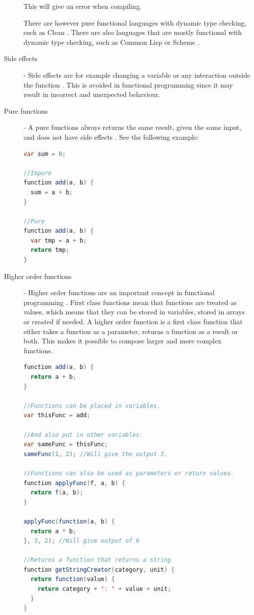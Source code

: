 \documentclass {article}
\begin{document}
\begin{description}
\item [ ] This will give an error when compiling.
\item[] There are however pure functional languages with dynamic type checking, such as Clean \cite{clean}. There are also languages that are mostly functional with dynamic type checking, such as Common Lisp \cite{commonLisp} or Scheme \cite{scheme} \cite{langTable}.
\item [Side effects] - Side effects are for example changing a variable or any interaction outside the function \cite{drboolean}. This is avoided in functional programming since it may result in incorrect and unexpected behaviour. 
\item [Pure functions] - A pure functions always returns the same result, given the same input, and does not have side effects \cite{drboolean}. See the following example: 

\begin{lstlisting}[language=Java]
var sum = 0;

//Impure
function add(a, b) {
  sum = a + b;
}

//Pure
function add(a, b) {
  var tmp = a + b;
  return tmp;
}
\end{lstlisting}

\item [Higher order functions] - Higher order functions are an important concept in functional programming \cite{fogus}. First class functions mean that functions are treated as values, which means that they can be stored in variables, stored in arrays or created if needed. A higher order function is a first class function that either takes a function as a parameter, returns a function as a result or both. This makes it possible to compose larger and more complex functions.

\begin{lstlisting}[language=Java, breaklines=true]
function add(a, b) {
  return a + b;
}

//Functions can be placed in variables.
var thisFunc = add;

//And also put in other variables.
var sameFunc = thisFunc;
sameFunc(1, 2); //Will give the output 3.

//Functions can also be used as parameters or return values.
function applyFunc(f, a, b) {
  return f(a, b);
}

applyFunc(function(a, b) {
  return a * b;
}, 3, 2); //Will give output of 6

//Returns a function that returns a string
function getStringCreator(category, unit) {
  return function(value) {
    return category + ': ' + value + unit;
  }
}


\end{lstlisting}
\end{description}
\end{document}
